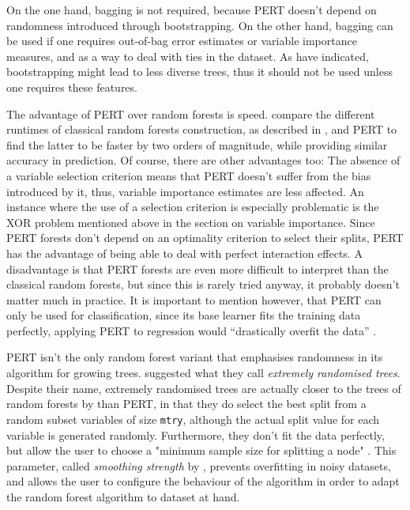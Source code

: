 \documentclass[a4paper,man,12pt,apacite,floatsintext,draftfirst]{apa6} %
\begin{document}
On the one hand, bagging is not required, because PERT doesn't depend on
randomness introduced through bootstrapping.
On the other hand, bagging can be used if one requires out-of-bag
error estimates or variable importance measures, and as a way to deal
with ties in the dataset.
As  have indicated, bootstrapping might lead
to less diverse trees, thus it should not be used unless one requires
these features.

The advantage of PERT over random forests is speed.
 compare the different runtimes of classical random
forests construction, as described in , and PERT
to find the latter to be faster by two orders of magnitude,
while providing similar accuracy in prediction.
Of course, there are other advantages too:
The absence of a variable selection criterion means that PERT doesn't suffer
from the bias introduced by it, thus, variable importance estimates are less
affected.
An instance where the use of a selection criterion is especially problematic
is the XOR problem mentioned above in the section on variable importance.
Since PERT forests don't depend on an optimality criterion to select their
splits, PERT has the advantage of being able to deal with perfect
interaction effects.
A disadvantage is that PERT forests are even more difficult to interpret than
the classical random forests, but since this is rarely tried anyway,
it probably doesn't matter much in practice.
It is important to mention however, that PERT can only be used for
classification,
since its base learner fits the training data perfectly, applying PERT to
regression would “drastically overfit the data” \cite{cutler2001pert}.

PERT isn't the only random forest variant that emphasises randomness in its
algorithm for growing trees.
 suggested what they call \emph{extremely randomised trees}.
Despite their name, extremely randomised trees are actually closer to the
trees of random forests by  than PERT, 
in that they do select the best split from a random subset variables of size \texttt{mtry},
although the actual split value for each variable is generated randomly.
Furthermore, they don't fit the data perfectly, but allow the user to
choose a "minimum sample size for splitting a node" \cite{geurts2006extremely}.
This parameter, called \emph{smoothing strength} by ,
prevents overfitting in noisy datasets, and allows the user to configure the
behaviour of the algorithm in order to adapt
the random forest algorithm to dataset at hand.
\end{document}
